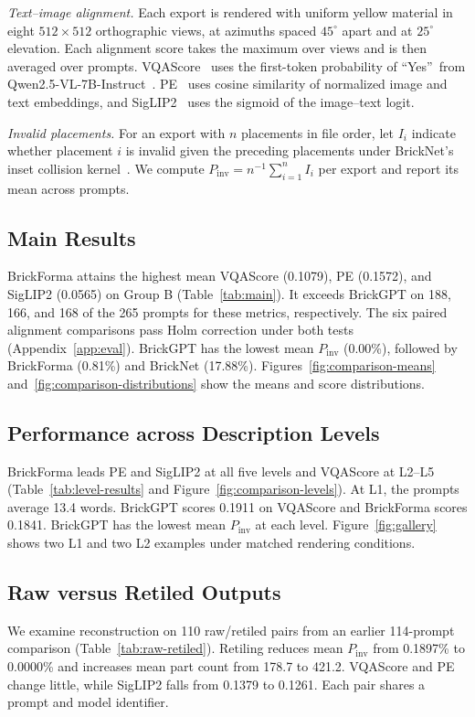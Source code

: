 \documentclass[letterpaper]{article} %
\begin{document}
\emph{Text--image alignment.}
Each export is rendered with uniform yellow material in eight $512{\times}512$ orthographic views, at azimuths spaced $45^\circ$ apart and at $25^\circ$ elevation. Each alignment score takes the maximum over views and is then averaged over prompts. VQAScore~\cite{vqascore} uses the first-token probability of \textquotedblleft Yes\textquotedblright\ from Qwen2.5-VL-7B-Instruct~\cite{qwen25vl}. PE~\cite{pe} uses cosine similarity of normalized image and text embeddings, and SigLIP2~\cite{siglip2} uses the sigmoid of the image--text logit.

\emph{Invalid placements.}
For an export with $n$ placements in file order, let $I_i$ indicate whether placement $i$ is invalid given the preceding placements under BrickNet's inset collision kernel~\cite{bricknet}. We compute $P_{\mathrm{inv}}=n^{-1}\sum_{i=1}^{n}I_i$ per export and report its mean across prompts.

\subsection{Main Results}

BrickForma attains the highest mean VQAScore (0.1079), PE (0.1572), and SigLIP2 (0.0565) on Group B (Table~\ref{tab:main}). It exceeds BrickGPT on 188, 166, and 168 of the 265 prompts for these metrics, respectively. The six paired alignment comparisons pass Holm correction under both tests (Appendix~\ref{app:eval}). BrickGPT has the lowest mean $P_{\mathrm{inv}}$ (0.00\%), followed by BrickForma (0.81\%) and BrickNet (17.88\%). Figures~\ref{fig:comparison-means} and~\ref{fig:comparison-distributions} show the means and score distributions.

\subsection{Performance across Description Levels}

BrickForma leads PE and SigLIP2 at all five levels and VQAScore at L2--L5 (Table~\ref{tab:level-results} and Figure~\ref{fig:comparison-levels}). At L1, the prompts average 13.4 words. BrickGPT scores 0.1911 on VQAScore and BrickForma scores 0.1841. BrickGPT has the lowest mean $P_{\mathrm{inv}}$ at each level. Figure~\ref{fig:gallery} shows two L1 and two L2 examples under matched rendering conditions.


\subsection{Raw versus Retiled Outputs}

We examine reconstruction on 110 raw/retiled pairs from an earlier 114-prompt comparison (Table~\ref{tab:raw-retiled}). Retiling reduces mean $P_{\mathrm{inv}}$ from 0.1897\% to 0.0000\% and increases mean part count from 178.7 to 421.2. VQAScore and PE change little, while SigLIP2 falls from 0.1379 to 0.1261. Each pair shares a prompt and model identifier.
\end{document}
